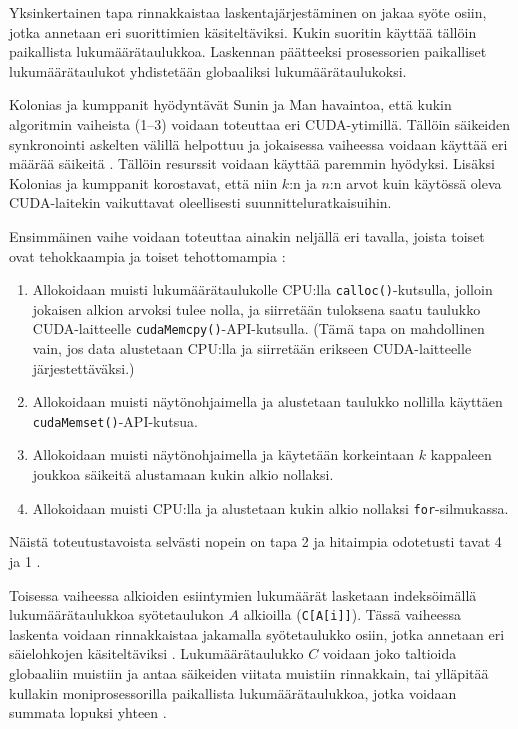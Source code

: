 \documentclass[a4paper,11pt]{article}
\begin{document}
Yksinkertainen tapa rinnakkaistaa laskentajärjestäminen on jakaa syöte osiin, jotka annetaan eri suorittimien käsiteltäviksi. Kukin suoritin käyttää tällöin paikallista lukumäärätaulukkoa. Laskennan päätteeksi prosessorien paikalliset lukumäärätaulukot yhdistetään globaaliksi lukumäärätaulukoksi.

Kolonias ja kumppanit hyödyntävät Sunin ja Man \cite{sun2009} havaintoa, että kukin algoritmin vaiheista (1--3) voidaan toteuttaa eri CUDA-ytimillä. Tällöin säikeiden synkronointi askelten välillä helpottuu ja jokaisessa vaiheessa voidaan käyttää eri määrää säikeitä \cite{kolonias2011}. Tällöin resurssit voidaan käyttää paremmin hyödyksi. Lisäksi Kolonias ja kumppanit korostavat, että niin $k$:n ja $n$:n arvot kuin käytössä oleva CUDA-laitekin vaikuttavat oleellisesti suunnitteluratkaisuihin.

Ensimmäinen vaihe voidaan toteuttaa ainakin neljällä eri tavalla, joista toiset ovat tehokkaampia ja toiset tehottomampia \cite{kolonias2011}:

\begin{enumerate}
\item Allokoidaan muisti lukumäärätaulukolle CPU:lla \verb,calloc(),-kutsulla, jolloin jokaisen alkion arvoksi tulee nolla, ja siirretään tuloksena saatu taulukko CUDA-laitteelle \verb,cudaMemcpy(),-API-kutsulla. (Tämä tapa on mahdollinen vain, jos data alustetaan CPU:lla ja siirretään erikseen CUDA-laitteelle järjestettäväksi.)
\item Allokoidaan muisti näytönohjaimella ja alustetaan taulukko nollilla käyttäen \verb,cudaMemset(),-API-kutsua.
\item Allokoidaan muisti näytönohjaimella ja käytetään korkeintaan $k$ kappaleen joukkoa säikeitä alustamaan kukin alkio nollaksi.
\item Allokoidaan muisti CPU:lla ja alustetaan kukin alkio nollaksi \verb,for,-silmukassa.
\end{enumerate}

Näistä toteutustavoista selvästi nopein on tapa 2 ja hitaimpia odotetusti tavat 4 ja 1 \cite{kolonias2011}.

Toisessa vaiheessa alkioiden esiintymien lukumäärät lasketaan indeksöimällä lukumäärätaulukkoa syötetaulukon $A$ alkioilla (\verb,C[A[i]],). Tässä vaiheessa laskenta voidaan rinnakkaistaa jakamalla syötetaulukko osiin, jotka annetaan eri säielohkojen käsiteltäviksi \cite{kolonias2011}. Lukumäärätaulukko $C$ voidaan joko taltioida globaaliin muistiin ja antaa säikeiden viitata muistiin rinnakkain, tai ylläpitää kullakin moniprosessorilla paikallista lukumäärätaulukkoa, jotka voidaan summata lopuksi yhteen \cite{kolonias2011}.
\end{document}
